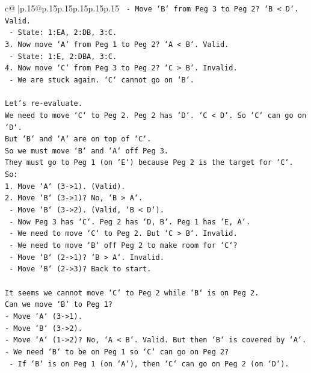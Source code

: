 \documentclass{article}
\begin{document}
{\begin{supertabular}{c@{$\;$}|p{.15\linewidth}@{}p{.15\linewidth}p{.15\linewidth}p{.15\linewidth}p{.15\linewidth}p{.15\linewidth}}
{{{\texttt{   {-} Move `B` from Peg 3 to Peg 2? `B < D`. Valid.} \\
\texttt{   {-} State: 1:EA, 2:DB, 3:C.} \\
\texttt{3. Now move `A` from Peg 1 to Peg 2? `A < B`. Valid.} \\
\texttt{   {-} State: 1:E, 2:DBA, 3:C.} \\
\texttt{4. Now move `C` from Peg 3 to Peg 2? `C > B`. Invalid.} \\
\texttt{   {-} We are stuck again. `C` cannot go on `B`.} \\
\\ 
\texttt{Let's re{-}evaluate.} \\
\texttt{We need to move `C` to Peg 2. Peg 2 has `D`. `C < D`. So `C` can go on `D`.} \\
\texttt{But `B` and `A` are on top of `C`.} \\
\texttt{So we must move `B` and `A` off Peg 3.} \\
\texttt{They must go to Peg 1 (on `E`) because Peg 2 is the target for `C`.} \\
\texttt{So:} \\
\texttt{1. Move `A` (3{-}>1). (Valid).} \\
\texttt{2. Move `B` (3{-}>1)? No, `B > A`.} \\
\texttt{   {-} Move `B` (3{-}>2). (Valid, `B < D`).} \\
\texttt{   {-} Now Peg 3 has `C`. Peg 2 has `D, B`. Peg 1 has `E, A`.} \\
\texttt{   {-} We need to move `C` to Peg 2. But `C > B`. Invalid.} \\
\texttt{   {-} We need to move `B` off Peg 2 to make room for `C`?} \\
\texttt{   {-} Move `B` (2{-}>1)? `B > A`. Invalid.} \\
\texttt{   {-} Move `B` (2{-}>3)? Back to start.} \\
\\ 
\texttt{It seems we cannot move `C` to Peg 2 while `B` is on Peg 2.} \\
\texttt{Can we move `B` to Peg 1?} \\
\texttt{{-} Move `A` (3{-}>1).} \\
\texttt{{-} Move `B` (3{-}>2).} \\
\texttt{{-} Move `A` (1{-}>2)? No, `A < B`. Valid. But then `B` is covered by `A`.} \\
\texttt{{-} We need `B` to be on Peg 1 so `C` can go on Peg 2?} \\
\texttt{  {-} If `B` is on Peg 1 (on `A`), then `C` can go on Peg 2 (on `D`).} \\
}}}
\end{supertabular}}
\end{document}
